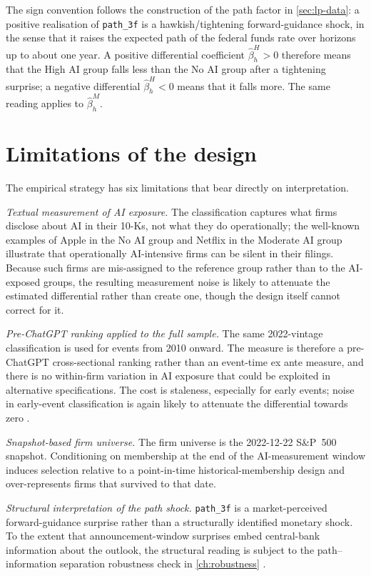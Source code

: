 The sign convention follows the construction of the path factor in \cref{sec:lp-data}: a positive realisation of \texttt{path\_3f} is a hawkish/tightening forward-guidance shock, in the sense that it raises the expected path of the federal funds rate over horizons up to about one year. A positive differential coefficient $\hat\beta_h^H > 0$ therefore means that the High AI group falls less than the No AI group after a tightening surprise; a negative differential $\hat\beta_h^H < 0$ means that it falls more. The same reading applies to $\hat\beta_h^M$.

\section{Limitations of the design}
\label{sec:emp-limitations}

The empirical strategy has six limitations that bear directly on interpretation.

\textit{Textual measurement of AI exposure.} The classification captures what firms disclose about AI in their 10-Ks, not what they do operationally; the well-known examples of Apple in the No AI group and Netflix in the Moderate AI group illustrate that operationally AI-intensive firms can be silent in their filings. Because such firms are mis-assigned to the reference group rather than to the AI-exposed groups, the resulting measurement noise is likely to attenuate the estimated differential rather than create one, though the design itself cannot correct for it.

\textit{Pre-ChatGPT ranking applied to the full sample.} The same 2022-vintage classification is used for events from 2010 onward. The measure is therefore a pre-ChatGPT cross-sectional ranking rather than an event-time ex ante measure, and there is no within-firm variation in AI exposure that could be exploited in alternative specifications. The cost is staleness, especially for early events; noise in early-event classification is again likely to attenuate the differential towards zero \citep{davisHansenSeminarioAmez2020, anteSaggu2025}.

\textit{Snapshot-based firm universe.} The firm universe is the 2022-12-22 S\&P~500 snapshot. Conditioning on membership at the end of the AI-measurement window induces selection relative to a point-in-time historical-membership design and over-represents firms that survived to that date.

\textit{Structural interpretation of the path shock.} \texttt{path\_3f} is a market-perceived forward-guidance surprise rather than a structurally identified monetary shock. To the extent that announcement-window surprises embed central-bank information about the outlook, the structural reading is subject to the path--information separation robustness check in \cref{ch:robustness} \citep{nakamuraSteinsson2018, jarocinskiKaradi2020, bauerSwanson2023, mirandaAgrippinoRicco2021}.

